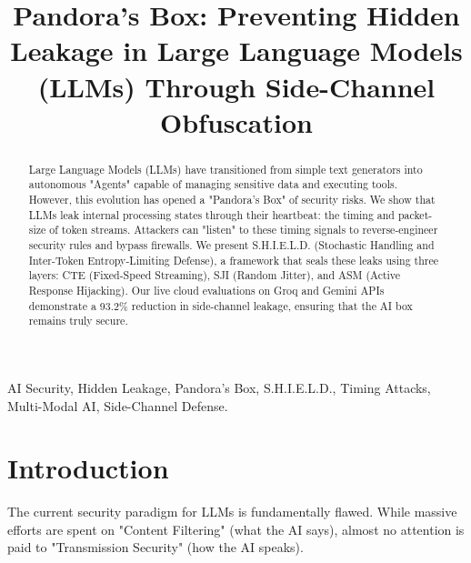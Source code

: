 \documentclass[conference]{IEEEtran}
\begin{document}
\title{Pandora's Box: Preventing Hidden Leakage in Large Language Models (LLMs) Through Side-Channel Obfuscation}

\author{
\and
{}
}

\maketitle

\begin{abstract}
Large Language Models (LLMs) have transitioned from simple text generators into autonomous "Agents" capable of managing sensitive data and executing tools. However, this evolution has opened a "Pandora's Box" of security risks. We show that LLMs leak internal processing states through their heartbeat: the timing and packet-size of token streams. Attackers can "listen" to these timing signals to reverse-engineer security rules and bypass firewalls. We present S.H.I.E.L.D. (Stochastic Handling and Inter-Token Entropy-Limiting Defense), a framework that seals these leaks using three layers: CTE (Fixed-Speed Streaming), SJI (Random Jitter), and ASM (Active Response Hijacking). Our live cloud evaluations on Groq and Gemini APIs demonstrate a 93.2\% reduction in side-channel leakage, ensuring that the AI box remains truly secure.
\end{abstract}

\begin{IEEEkeywords}
AI Security, Hidden Leakage, Pandora's Box, S.H.I.E.L.D., Timing Attacks, Multi-Modal AI, Side-Channel Defense.
\end{IEEEkeywords}

\section{Introduction}
The current security paradigm for LLMs is fundamentally flawed. While massive efforts are spent on "Content Filtering" (what the AI says), almost no attention is paid to "Transmission Security" (how the AI speaks).
\end{document}
